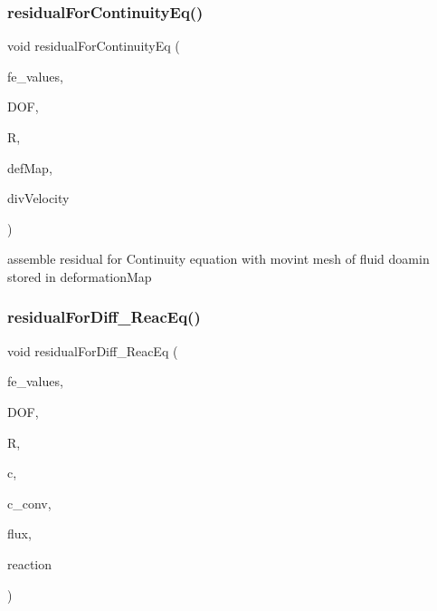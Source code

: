\subsubsection{\texorpdfstring{residual\+For\+Continuity\+Eq()}{residualForContinuityEq()}\hspace{0.1cm}{\footnotesize\ttfamily [2/2]}}
{\footnotesize\ttfamily void residual\+For\+Continuity\+Eq (\begin{DoxyParamCaption}\item[{const F\+E\+Values$<$ dim $>$ \&}]{fe\+\_\+values,  }\item[{unsigned int}]{D\+OF,  }\item[{Table$<$ 1, T $>$ \&}]{R,  }\item[{\mbox{\hyperlink{structdeformation_map}{deformation\+Map}}$<$ T, dim $>$ \&}]{def\+Map,  }\item[{Table$<$ 1, T $>$ \&}]{div\+Velocity }\end{DoxyParamCaption})}

assemble residual for Continuity equation with movint mesh of fluid doamin stored in deformation\+Map \mbox{\label{class_residual_a144663fb81fc60d4db0c5a8e45176e61}} 
\subsubsection{\texorpdfstring{residual\+For\+Diff\+\_\+\+Reac\+Eq()}{residualForDiff\_ReacEq()}\hspace{0.1cm}{\footnotesize\ttfamily [1/2]}}
{\footnotesize\ttfamily void residual\+For\+Diff\+\_\+\+Reac\+Eq (\begin{DoxyParamCaption}\item[{const F\+E\+Values$<$ dim $>$ \&}]{fe\+\_\+values,  }\item[{unsigned int}]{D\+OF,  }\item[{dealii\+::\+Table$<$ 1, T $>$ \&}]{R,  }\item[{dealii\+::\+Table$<$ 1, T $>$ \&}]{c,  }\item[{dealii\+::\+Table$<$ 1, double $>$ \&}]{c\+\_\+conv,  }\item[{dealii\+::\+Table$<$ 2, T $>$ \&}]{flux,  }\item[{dealii\+::\+Table$<$ 1, T $>$ \&}]{reaction }\end{DoxyParamCaption})}

